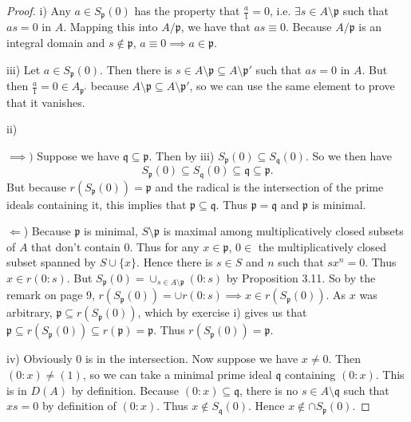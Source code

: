 \begin{proof}
	i) Any $a \in S_ \mathfrak{p}(0) $ has the property that $\frac{a}{1} = 0 $, i.e. $\exists s\in A \setminus \mathfrak{p} $ such that $as = 0$ in $A $.
	Mapping this into $A / \mathfrak{p} $, we have that $as \equiv 0 $.
	Because $A / \mathfrak{p} $ is an integral domain and $s \notin \mathfrak{p} $, $a\equiv 0 \implies a \in \mathfrak{p}$.

	iii) Let $a \in S_ \mathfrak{p}(0) $.
	Then there is $s \in A \setminus \mathfrak{p} \subseteq A \setminus \mathfrak{p}' $ such that $as = 0 $ in $A $.
	But then $\frac{a}{1} = 0 \in A_{\mathfrak{p}'} $ because $A \setminus \mathfrak{p} \subseteq A \setminus \mathfrak{p}' $, so we can use the same element to prove that it vanishes.

	ii)

	$\implies) $ Suppose we have $\mathfrak{q} \subseteq \mathfrak{p} $.
	Then by iii) $S_{\mathfrak{p}}(0) \subseteq S_{\mathfrak{q}}(0)$.
	So we then have
	\[
		S_{\mathfrak{p}}(0) \subseteq S_{\mathfrak{q}}(0) \subseteq \mathfrak{q} \subseteq \mathfrak{p}
	.\] 
	But because $r(S_{\mathfrak{p}}(0)) = \mathfrak{p} $ and the radical is the intersection of the prime ideals containing it, this implies that $\mathfrak{p}\subseteq \mathfrak{q} $.
	Thus $\mathfrak{p} = \mathfrak{q} $ and $\mathfrak{p} $ is minimal.

	$\Leftarrow $)
	Because $\mathfrak{p} $ is minimal, $S \setminus \mathfrak{p} $ is maximal among multiplicatively closed subsets of $A $ that don't contain $0 $.
	Thus for any $x \in \mathfrak{p} $, $0 \in $ the multiplicatively closed subset spanned by $S \cup \{x\}   $.
	Hence there is $s\in S $ and $n $ such that $sx^n = 0 $.
	Thus $x \in r(0:s) $.
	But $S_{\mathfrak{p}}(0) = \cup_{s \in A \setminus \mathfrak{p}} (0:s) $ by Proposition 3.11.
	So by the remark on page 9, $r(S_{\mathfrak{p}}(0)) = \cup r(0:s) \implies x \in r(S_{\mathfrak{p}}(0)) $.
	As $x $ was arbitrary, $\mathfrak{p}\subseteq r(S_{\mathfrak{p}}(0)) $, which by exercise i) gives us that $\mathfrak{p} \subseteq r(S_{\mathfrak{p}}(0)) \subseteq r(\mathfrak{p}) = \mathfrak{p} $.
	Thus $r(S_{\mathfrak{p}}(0)) = \mathfrak{p} $.

	iv) Obviously $0 $ is in the intersection.
	Now suppose we have $x \ne 0$.
	Then $(0:x) \ne (1) $, so we can take a minimal prime ideal $\mathfrak{q} $ containing $(0:x) $.
	This is in $D(A) $ by definition.
	Because $(0:x) \subseteq \mathfrak{q} $, there is no $s \in A \setminus \mathfrak{q} $ such that $xs = 0 $ by definition of $(0:x) $.
	Thus $x \notin S_{\mathfrak{q}}(0) $.
	Hence $x\notin \cap S_{\mathfrak{p}}(0)$.
\end{proof}

